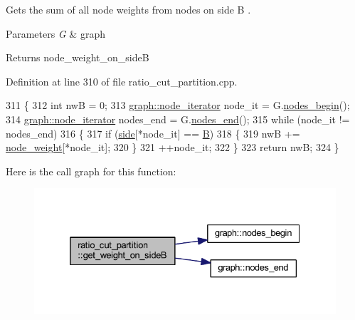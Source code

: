 Gets the sum of all node weights from nodes on side {\ttfamily B }.


\begin{DoxyParams}{Parameters}
{\em G} & graph \\
\hline
\end{DoxyParams}
\begin{DoxyReturn}{Returns}
{\ttfamily node\+\_\+weight\+\_\+on\+\_\+sideB} 
\end{DoxyReturn}


Definition at line 310 of file ratio\+\_\+cut\+\_\+partition.\+cpp.


\begin{DoxyCode}
311 \{
312     \textcolor{keywordtype}{int} nwB = 0;
313     \mbox{\hyperlink{classgraph_a2cb374b84c133ce13f94e73c3e5da7fa}{graph::node\_iterator}} node\_it = G.\mbox{\hyperlink{classgraph_aec053a4b509d1be804237a80044c54c0}{nodes\_begin}}();
314     \mbox{\hyperlink{classgraph_a2cb374b84c133ce13f94e73c3e5da7fa}{graph::node\_iterator}} nodes\_end = G.\mbox{\hyperlink{classgraph_abbf9c0cb5629e98e1142254911238173}{nodes\_end}}();
315     \textcolor{keywordflow}{while} (node\_it != nodes\_end)
316     \{
317     \textcolor{keywordflow}{if} (\mbox{\hyperlink{classratio__cut__partition_a2bf913d1d8607747885177a3b585e611}{side}}[*node\_it] == \mbox{\hyperlink{classratio__cut__partition_adf075987228d8adc7950d5b1ba332daa}{B}})
318     \{
319         nwB += \mbox{\hyperlink{classratio__cut__partition_a4d9d2a9317a062f839ea7155c37b173f}{node\_weight}}[*node\_it];
320     \}
321     ++node\_it;
322     \}
323     \textcolor{keywordflow}{return} nwB;
324 \}
\end{DoxyCode}
Here is the call graph for this function\+:\nopagebreak
\begin{figure}[H]
\begin{center}
\leavevmode
\includegraphics[width=332pt]{classratio__cut__partition_abd0835eeaec80f5ba56de5428985259f_cgraph}
\end{center}
\end{figure}
\mbox{\label{classratio__cut__partition_ae257dadc6cea5aef11badb68eadba0a5}} 
